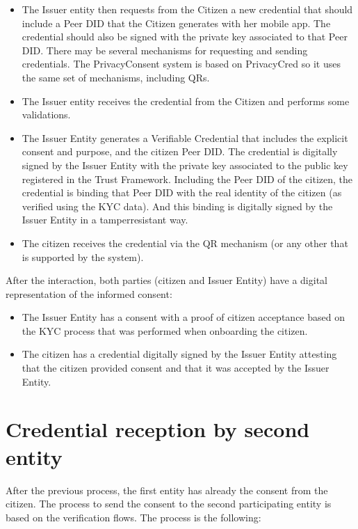 \documentclass[a4paper,12pt,english,openany]{sphinxmanual}
\begin{document}
\begin{itemize}
\item {} 
\sphinxAtStartPar
The Issuer entity then requests from the Citizen a new credential that should include a Peer DID that the Citizen generates with her mobile app. The credential should also be signed with the private key associated to that Peer DID. There may be several mechanisms for requesting and sending credentials. The PrivacyConsent system is based on PrivacyCred so it uses the same set of mechanisms, including QRs.

\item {} 
\sphinxAtStartPar
The Issuer entity receives the credential from the Citizen and performs some validations.

\item {} 
\sphinxAtStartPar
The Issuer Entity generates a Verifiable Credential that includes the explicit consent and purpose, and the citizen Peer DID. The credential is digitally signed by the Issuer Entity with the private key associated to the public key registered in the Trust Framework. Including the Peer DID of the citizen, the credential is binding that Peer DID with the real identity of the citizen (as verified using the KYC data). And this binding is digitally signed by the Issuer Entity in a tamper\sphinxhyphen{}resistant way.

\item {} 
\sphinxAtStartPar
The citizen receives the credential via the QR mechanism (or any other that is supported by the system).

\end{itemize}

\sphinxAtStartPar
After the interaction, both parties (citizen and Issuer Entity) have a digital representation of the informed consent:
\begin{itemize}
\item {} 
\sphinxAtStartPar
The Issuer Entity has a consent with a proof of citizen acceptance based on the KYC process that was performed when onboarding the citizen.

\item {} 
\sphinxAtStartPar
The citizen has a credential digitally signed by the Issuer Entity attesting that the citizen provided consent and that it was accepted by the Issuer Entity.

\end{itemize}


\section{Credential reception by second entity}
\label{\detokenize{privacyconsent:credential-reception-by-second-entity}}
\sphinxAtStartPar
After the previous process, the first entity has already the consent from the citizen. The process to send the consent to the second participating entity is based on the verification flows. The process is the following:
\end{document}
